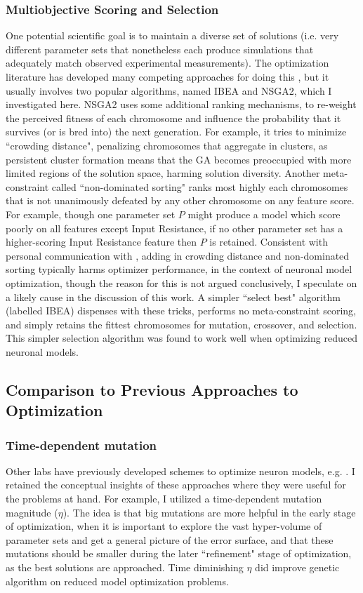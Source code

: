 \subsubsection{Multiobjective Scoring and Selection}
One potential scientific goal is to maintain a diverse set of solutions (i.e. very different parameter sets that nonetheless each produce simulations that adequately match observed experimental measurements).
The optimization literature has developed many competing approaches for doing this \citep{deb2000fast}, but it usually involves two popular algorithms, named IBEA and NSGA2, which I investigated here.
NSGA2 uses some additional ranking mechanisms, to re-weight the perceived fitness of each chromosome and influence the probability that it survives (or is bred into) the next generation.
For example, it tries to minimize ``crowding distance", penalizing chromosomes that aggregate in clusters, as persistent cluster formation means that the GA becomes preoccupied with more limited regions of the solution space, harming solution diversity.
Another meta-constraint called ``non-dominated sorting" ranks most highly each chromosomes that is not unanimously defeated by any other chromosome on any feature score.
For example, though one parameter set $P$ might produce a model which score poorly on all features except Input Resistance, if no other parameter set has a higher-scoring Input Resistance feature then $P$ is retained. Consistent with personal communication with \cite{van2007neurofitter}, adding in crowding distance and non-dominated sorting typically harms optimizer performance, in the context of neuronal model optimization, though the reason for this is not argued conclusively, I speculate on a likely cause in the discussion of this work.
A simpler ``select best" algorithm (labelled IBEA) dispenses with these tricks, performs no meta-constraint scoring, and simply retains the fittest chromosomes for mutation, crossover, and selection. This simpler selection algorithm was found to work well when optimizing reduced neuronal models.

\subsection{Comparison to Previous Approaches to Optimization}

\subsubsection{Time-dependent mutation}
Other labs have previously developed schemes to optimize neuron models, e.g. \cite{druckmann2007novel}.
I retained the conceptual insights of these approaches where they were useful for the problems at hand.
For example, I utilized a time-dependent mutation magnitude ($\eta$).
The idea is that big mutations are more helpful in the early stage of optimization, when it is important to explore the vast hyper-volume of parameter sets and get a general picture of the error surface, and that these mutations should be smaller during the later ``refinement" stage of optimization, as the best solutions are approached. Time diminishing $\eta$ did improve genetic algorithm on reduced model optimization problems.

